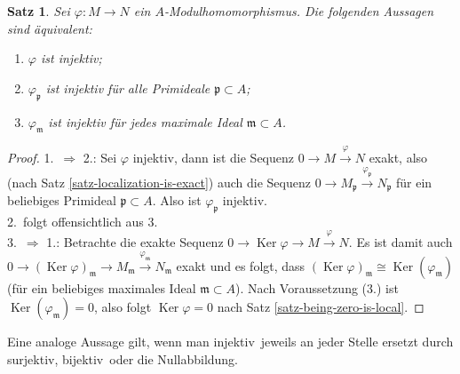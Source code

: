 \documentclass[reqno,12pt]{article}
\numberwithin{equation}{section}
\newcommand{\Ker}{\text{Ker }}
\theoremstyle{plain}
\newtheorem{proposition}[thm]{Satz}
\theoremstyle{definition}
\renewcommand{\Ker}{\operatorname{Ker}}
\begin{document}
\begin{proposition}\label{satz-injectivity-is-local}
Sei $\varphi\colon M\to N$ ein $A$-Modulhomomorphismus. Die folgenden Aussagen sind äquivalent:
\begin{enumerate}
	\item $\varphi$ ist injektiv;
	\item $\varphi_\mathfrak{p}$ ist injektiv für alle Primideale $\mathfrak{p}\subset A$;
	\item $\varphi_\mathfrak{m}$ ist injektiv für jedes maximale Ideal $\mathfrak{m}\subset A$.
\end{enumerate}
\end{proposition}
\begin{proof}
1.\ $\Rightarrow$ 2.: Sei $\varphi$ injektiv, dann ist die Sequenz $0\to M\overset{\varphi}{\to} N$ exakt, also (nach Satz \ref{satz-localization-is-exact}) auch die Sequenz $0\to M_\mathfrak{p}\overset{\varphi_\mathfrak{p}}{\to}N_\mathfrak{p}$ für ein beliebiges Primideal $\mathfrak{p}\subset A$. Also ist $\varphi_\mathfrak{p}$ injektiv.\\
2.\ folgt offensichtlich aus 3.\\
3.\ $\Rightarrow$ 1.: Betrachte die exakte Sequenz $0\to \Ker \varphi \to M \overset{\varphi}{\to}N$. Es ist damit auch $0\to (\Ker\varphi)_\mathfrak{m} \to M_\mathfrak{m}\overset{\varphi_\mathfrak{m}}{\to}N_\mathfrak{m}$ exakt und es folgt, dass $(\Ker \varphi)_\mathfrak{m}\cong \Ker(\varphi_\mathfrak{m})$ (für ein beliebiges maximales Ideal $\mathfrak{m}\subset A$). Nach Voraussetzung (3.) ist $\Ker(\varphi_\mathfrak{m})=0$, also folgt $\Ker\varphi=0$ nach Satz \ref{satz-being-zero-is-local}.
\end{proof}
Eine analoge Aussage gilt, wenn man \glqq injektiv\grqq\, jeweils an jeder Stelle ersetzt durch \glqq surjektiv\grqq, \glqq bijektiv\grqq\, oder \glqq die Nullabbildung\grqq.
\end{document}
